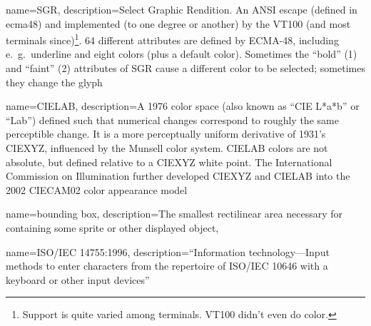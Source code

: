 {
  name={SGR},
    description={Select Graphic Rendition. An ANSI escape (defined in
      \Gls{ecma48}) and implemented (to one degree or another) by the
      VT100\cite{vt100} (and most terminals since)\footnote{Support is quite varied
      among terminals. VT100 didn't even do color.}. 64 different
      attributes are defined by ECMA-48, including e.\ g.\ underline and
      eight colors (plus a default color). Sometimes the ``bold'' (1) and
      ``faint'' (2) attributes of SGR cause a different color to be selected;
      sometimes they change the glyph}
}

{
  name={CIELAB},
  description={A 1976 color space (also known as ``CIE L*a*b'' or ``Lab'') defined such that
  numerical changes correspond to roughly the same perceptible change. It is
  a more perceptually uniform derivative of 1931's CIEXYZ, influenced by the
  Munsell color system. CIELAB colors are not absolute, but defined relative
  to a CIEXYZ white point. The International Commission on Illumination further
  developed CIEXYZ and CIELAB into the 2002 CIECAM02 color appearance model}
}

{
  name={bounding box},
  description={The smallest rectilinear area necessary for containing some
    sprite or other displayed object},
}

{
  name={ISO/IEC 14755:1996},
  description={``Information technology---Input methods to enter characters from the repertoire of ISO/IEC 10646 with a
    keyboard or other input devices''}
}
